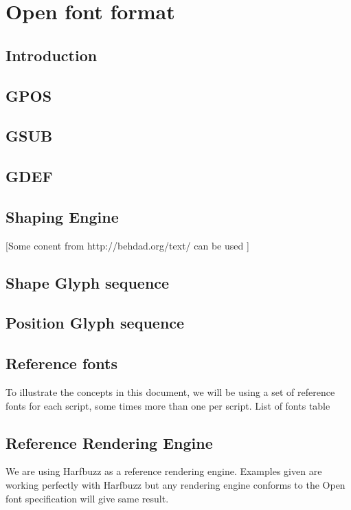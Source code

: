 \chapter{Open font format}

\section{Introduction}

\section{GPOS}

\section{GSUB}

\section{GDEF}

\section{Shaping Engine}

[Some conent from http://behdad.org/text/ can be used ]
\section{Shape Glyph sequence}

\section{Position Glyph sequence}

\section{Reference fonts}

To illustrate the concepts in this document, we will be using a set of reference fonts for each script, some times more than one per script. 
List of fonts table

\section{Reference Rendering Engine}

We are using Harfbuzz as  a reference rendering engine. Examples given are working perfectly with Harfbuzz but any rendering engine conforms to the Open font specification will give same result.

